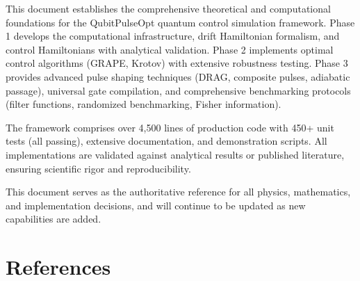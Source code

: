 \documentclass[11pt,a4paper]{article}
\theoremstyle{definition}
\theoremstyle{remark}
\begin{document}
This document establishes the comprehensive theoretical and computational foundations for the QubitPulseOpt quantum control simulation framework. Phase 1 develops the computational infrastructure, drift Hamiltonian formalism, and control Hamiltonians with analytical validation. Phase 2 implements optimal control algorithms (GRAPE, Krotov) with extensive robustness testing. Phase 3 provides advanced pulse shaping techniques (DRAG, composite pulses, adiabatic passage), universal gate compilation, and comprehensive benchmarking protocols (filter functions, randomized benchmarking, Fisher information).

The framework comprises over 4,500 lines of production code with 450+ unit tests (all passing), extensive documentation, and demonstration scripts. All implementations are validated against analytical results or published literature, ensuring scientific rigor and reproducibility.

This document serves as the authoritative reference for all physics, mathematics, and implementation decisions, and will continue to be updated as new capabilities are added.

\section*{References}
\end{document}
